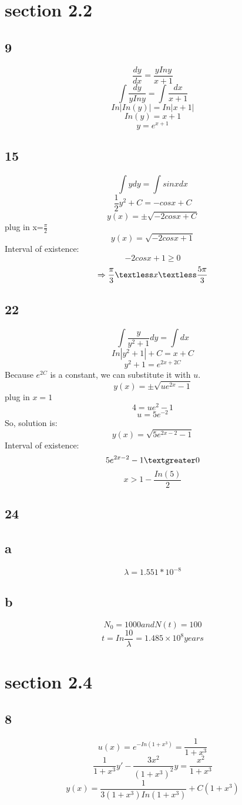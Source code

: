 \documentclass[12pt, a4paper]{IEEEtran}
\begin{document}
    \section*{section 2.2}
    \subsection*{9}
    $$\frac{dy}{dx}=\frac{yIny}{x+1}$$
    $$\int \frac{dy}{yIny}=\int \frac{dx}{x+1}$$
    $$In|In(y)|=In|x+1|$$
    $$In(y)=x+1$$
    $$y=e^{x+1}$$

    \subsection*{15}
    $$\int ydy =\int sinx dx$$
    $$\frac{1}{2}y^2+C=-cosx+C$$
    $$y(x)=\pm\sqrt{-2cosx+C}$$
    plug in x=$\frac{\pi}{2}$
    $$y(x)=\sqrt{-2cosx+1}$$
    Interval of existence:
    $$-2cosx+1 \geq 0$$
    $$\Rightarrow \frac{\pi}{3}\textless x\textless\frac{5\pi}{3} $$


    \subsection*{22}
    $$\int \frac{y}{y^2+1}dy=\int dx$$
    $$In|y^2+1|+C=x+C$$
    $$y^2+1=e^{2x+2C}$$
    Because $e^{2C}$ is a constant, we can substitute it with $u$.
    $$y(x)=\pm \sqrt{ue^{2x}-1}$$
    plug in $x=1$
    $$4=ue^2-1$$
    $$u=5e^{-2}$$
    So, solution is:
    $$y(x)=\sqrt{5e^{2x-2}-1}$$
    Interval of existence:
    $$5e^{2x-2}-1\textgreater 0$$
    $$x>1-\frac{In(5)}{2}$$

    \subsection*{24}
    \subsection*{a}
    $$\lambda =1.551*10^{-8} $$
    \subsection*{b}
    $$N_0=1000 and N(t)=100$$
    $$t=In \frac{10}{\lambda}=1.485\times10^8 years$$
    
    
    \section*{section 2.4}
    \subsection*{8}
    $$u(x)=e^{-In(1+x^3)}=\frac{1}{1+x^3}$$
    $$\frac{1}{1+x^3}y'-\frac{3x^2}{(1+x^3)^2}y=\frac{x^2}{1+x^3}$$
    $$y(x)=\frac{1}{3(1+x^3)In(1+x^3)}+C(1+x^3)$$
\end{document}
